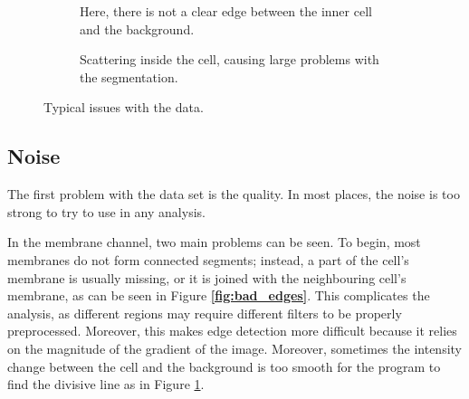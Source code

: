 \documentclass[
  digital,     %
  oneside,     %
  nosansbold,  %
  nocolorbold, %
  lof,         %
  lot,         %
]{fithesis4}
\begin{document}
\begin{figure}
\begin{subfigure}[t]{0.3\textwidth}
        \caption{Here, there is not a clear edge between the inner cell and the
        background.}
        \label{fig:bleeding_edges}
    \end{subfigure}
    \hfill
    \begin{subfigure}[t]{0.5\textwidth}
        \centering
        \caption{Scattering inside the cell, causing large problems with the
        segmentation.}
        \label{fig:scattering}
    \end{subfigure}
    \caption{Typical issues with the data.}
    \label{fig:labelling_example}
\end{figure}

\subsection{Noise}

The first problem with the data set is the quality. In most places, the noise is
too strong to try to use in any analysis.

In the membrane channel, two main problems can be seen. To begin, most
membranes do not form connected segments; instead, a part of the cell's membrane is
usually missing, or it is joined with the neighbouring cell's membrane, as can be
seen in Figure \textbf{\ref{fig:bad_edges}}. This complicates the analysis, as different
regions may require different filters to be properly preprocessed. Moreover,
this makes edge detection more difficult because it relies on the magnitude of
the gradient of the image. Moreover, sometimes the intensity change between the cell and the
background is too smooth for the program to find the divisive line as in Figure
\ref{fig:bleeding_edges}.
\end{document}
